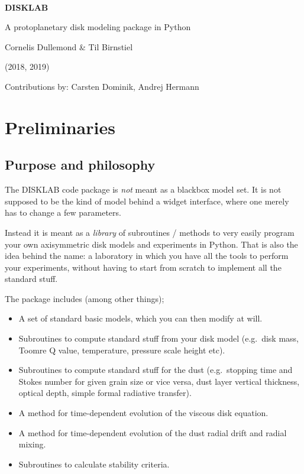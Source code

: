 \documentclass{book}
\begin{document}
\mbox{}
\vspace{9em}\\

\centerline{\Huge\bf\sf DISKLAB}\vspace{1em}
\centerline{\Huge\sf A protoplanetary disk modeling package in Python}\vspace{1em}
\centerline{\large\sf Cornelis Dullemond \& Til Birnstiel}\vspace{1em}
\centerline{\large\sf (2018, 2019)}\vspace{3em}
\centerline{\sf Contributions by: Carsten Dominik, Andrej Hermann}\vspace{1em}

\newpage

\tableofcontents

\newpage

\chapter{Preliminaries}

\section{Purpose and philosophy}
The {\sf DISKLAB} code package is {\em not} meant as a blackbox model set.
It is not supposed to be the kind of model behind a widget interface, where
one merely has to change a few parameters.

Instead it is meant as a {\em library} of subroutines / methods to very easily
program your own axisymmetric disk models and experiments in Python. That is
also the idea behind the name: a laboratory in which you have all the tools to
perform your experiments, without having to start from scratch to implement all
the standard stuff.

The package includes (among other things);
\begin{itemize}
\item A set of standard basic models, which you can then modify at will.
\item Subroutines to compute standard stuff from your disk model (e.g.\ disk mass,
  Toomre Q value, temperature, pressure scale height etc).
\item Subroutines to compute standard stuff for the dust (e.g.\ stopping time
  and Stokes number for given grain size or vice versa, dust layer vertical thickness,
  optical depth, simple formal radiative transfer).
\item A method for time-dependent evolution of the viscous disk equation.
\item A method for time-dependent evolution of the dust radial drift and radial mixing.
\item Subroutines to calculate stability criteria.
\end{itemize}
\end{document}

